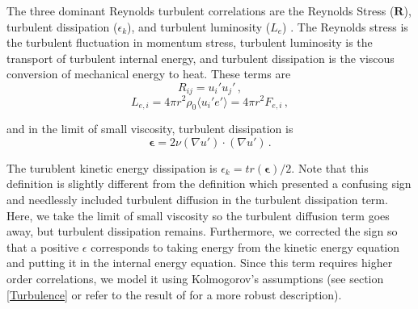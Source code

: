 \documentclass[twocolumn]{aastex6}
\begin{document}
The three
dominant Reynolds turbulent correlations are the Reynolds Stress
($\textbf{R}$), turbulent dissipation ($\epsilon_k$), and turbulent
luminosity ($L_e$) \citep{murphy11,murphy13}. The Reynolds stress is
the turbulent fluctuation in momentum stress, turbulent luminosity is the transport of turbulent internal energy, and turbulent dissipation is the viscous conversion of mechanical
energy to heat. These terms are
\begin{equation}
  R_{ij} = u_i' u_j' \, ,
\end{equation}
\begin{equation}
  L_{e,i} = 4 \pi r^2 \rho_0 \langle u_i' e' \rangle = 4 \pi r^2 F_{e,i}  \, , 
\end{equation}

and in the limit of small viscosity, turbulent dissipation is
\begin{equation}
  {\bm \epsilon} = 2 \nu ( \nabla u') \cdot ( \nabla u' ) \, .
\end{equation}

The turublent kinetic energy dissipation is $\epsilon_k = tr({\bm \epsilon})/2$. Note that this definition is slightly different from the \citet{murphy11b} definition which presented a confusing sign and needlessly included turbulent diffusion in the turbulent dissipation term. Here, we take the limit of small viscosity so the turbulent diffusion term goes away, but turbulent dissipation remains. Furthermore, we corrected the sign so that a positive $\epsilon$ corresponds to taking energy from the kinetic energy equation and putting it in the internal energy equation.  Since this term requires higher order correlations, we model it using Kolmogorov's assumptions (see section \ref{Turbulence} or refer to the result of \citet{canuto93} for a more robust description).
\end{document}

